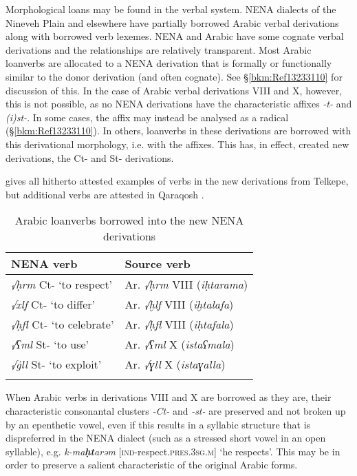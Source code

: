 \documentclass[output=paper]{langsci/langscibook}
\begin{document}
Morphological loans may be found in the verbal system.  NENA dialects of the Nineveh Plain and elsewhere have partially borrowed Arabic verbal derivations along with borrowed verb lexemes. NENA and Arabic have some {cognate} verbal derivations and the relationships are relatively transparent. Most Arabic loanverbs are allocated to a NENA {derivation} that is formally or functionally similar to the donor {derivation} (and often {cognate}). See §\ref{bkm:Ref13233110} for discussion of this. In the case of Arabic verbal derivations VIII and X, however, this is not possible, as no NENA derivations have the characteristic affixes \textit{{}-t-} and \textit{(i)st-}. In some cases, the affix may instead be analysed as a radical (§\ref{bkm:Ref13233110}). In others, loanverbs in these derivations are borrowed with this {derivational} morphology, i.e. with the affixes. This has, in effect, created new derivations, the Ct- and St- derivations.

 gives all hitherto attested examples of verbs in the new derivations from  Telkepe, but additional verbs are attested in  Qaraqosh \citep[130]{Khan2002}.

\begin{table}
\caption{Arabic loanverbs borrowed into the new NENA derivations\label{tab:coghill:1}}
\begin{tabularx}{.75\textwidth}{QQ}
\lsptoprule
{NENA verb} & {Source verb}\\\midrule
{\textit{√ḥrm} Ct- ‘to respect’} & {Ar. \textit{√ḥrm} VIII (\textit{iḥtarama})}\\
\textit{√xlf} Ct- ‘to differ’ & {Ar. \textit{√ḫlf} VIII (\textit{iḫtalafa})}\\
{\textit{√ḥfl} Ct- ‘to celebrate’} & {Ar. \textit{√ḥfl} VIII (\textit{iḥtafala})}\\
{\textit{√ʕml} St- ‘to use’} & {Ar. \textit{√ʕml} X (\textit{istaʕmala})}\\
\textit{√\.gll} St- ‘to exploit’ & {Ar. \textit{√ɣll} X (\textit{istaɣalla})}\\
\lspbottomrule
\end{tabularx}
\end{table}

When Arabic verbs in derivations VIII and X are borrowed as they are, their characteristic consonantal clusters \textit{{}-Ct-} and \textit{{}-st-} are preserved and not broken up by an epenthetic vowel, even if this results in a {syllabic structure} that is dispreferred in the NENA dialect (such as a stressed short vowel in an open syllable), e.g. \textit{k-ma}\kern -0.5pt\textbf{\textit{ḥt}}\kern -1pt\textit{arəm} [\textsc{ind}\nobreakdash-respect.\textsc{pres.}3\textsc{sg.m}] ‘he respects’. This may be in order to preserve a salient characteristic of the original Arabic forms.
\end{document}
